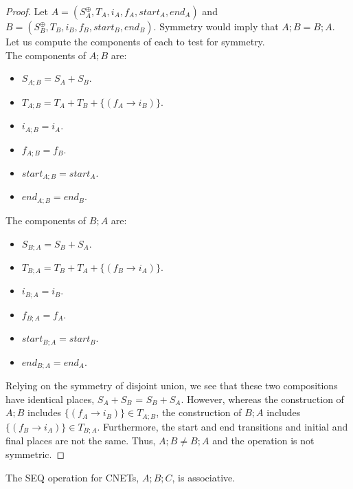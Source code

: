 \begin{proof}
Let $A = (S_A^\oplus, T_A, i_A, f_A, start_A, end_A)$ and $B = (S_B^\oplus, T_B, i_B, f_B, start_B, end_B)$. Symmetry would imply that $A;B = B;A$. Let us compute the components of each to test for symmetry. \\
The components of $A;B$ are: 
\begin{itemize}
 \item $S_{A;B} = S_A + S_B$.
 \item $T_{A;B} = T_A + T_B + \{(f_A \to i_B)\}$.
 \item $i_{A;B} = i_A$.
 \item $f_{A;B} = f_B$.
 \item $start_{A;B} = start_A$.
 \item $end_{A;B} = end_B$.
\end{itemize}
The components of $B;A$ are: 
\begin{itemize}
 \item $S_{B;A} = S_B + S_A$.
 \item $T_{B;A} = T_B + T_A + \{(f_B \to i_A)\}$.
 \item $i_{B;A} = i_B$.
 \item $f_{B;A} = f_A$.
 \item $start_{B;A} = start_B$.
 \item $end_{B;A} = end_A$.
\end{itemize}
Relying on the symmetry of disjoint union, we see that these two compositions have identical places, $S_A + S_B$ = $S_B + S_A$. However, whereas the construction of $A;B$ includes $\{(f_A \to i_B)\} \in T_{A;B}$, the construction of $B;A$ includes $\{(f_B \to i_A)\} \in T_{B;A}.$ Furthermore, the start and end transitions and initial and final places are not the same. Thus, $A;B \neq B;A$ and the operation is not symmetric.
\end{proof}
\begin{lemma}
\label{lemma:SEQ-ASSOC}
The SEQ operation for CNETs, $A;B;C$, is associative.
\end{lemma}
